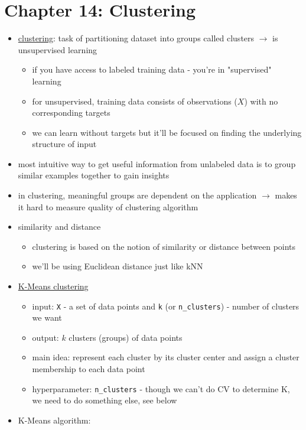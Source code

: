 \documentclass[10.5pt,a4paper, fleqn, dvipsnames]{article}
\makeatletter
\newcommand*{\sectionbookmark}[1][]{%
  \bookmark[%
    level=section,%
    dest=\@currentHref,%
    #1%
  ]%
}
\makeatother
\begin{document}
\section*{Chapter 14: Clustering}
\sectionbookmark{Chapter 14: Clustering}
\begin{itemize}
    \item \ul{clustering}: task of partitioning dataset into groups called clusters $\rightarrow$ is unsupervised learning 
    \begin{itemize}
        \item if you have access to labeled training data - you're in "supervised" learning 
        \item for unsupervised, training data consists of observations ($X$) with no corresponding targets
        \item we can learn without targets but it'll be focused on finding the underlying structure of input 
    \end{itemize}
    \item most intuitive way to get useful information from unlabeled data is to group similar examples together to gain insights
    \item in clustering, meaningful groups are dependent on the application $\rightarrow$ makes it hard to measure quality of clustering algorithm
    \item similarity and distance
    \begin{itemize}
        \item clustering is based on the notion of similarity or distance between points 
        \item we'll be using Euclidean distance just like kNN
    \end{itemize}
    \item \ul{K-Means clustering}
    \begin{itemize}
        \item input: \lstinline{X} - a set of data points and \lstinline{k} (or \lstinline{n_clusters}) - number of clusters we want
        \item output: $k$ clusters (groups) of data points 
        \item main idea: represent each cluster by its cluster center and assign a cluster membership to each data point
        \item hyperparameter: \lstinline{n_clusters} - though we can't do CV to determine K, we need to do something else, see below 
    \end{itemize}
    \item K-Means algorithm:

\end{itemize}
\end{document}
